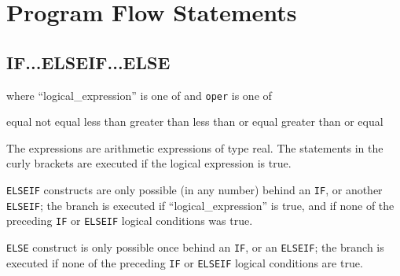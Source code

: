 
\chapter{Program Flow Statements}

 




\section{IF...ELSEIF...ELSE}
\label{sec:if}


where ``logical\_expression'' is one of 
and \texttt{oper} is one of 
\begin{madlist}
\ttitem{==}  equal
\ttitem{<>}  not equal
\ttitem{<}  less than
\ttitem{>}  greater than
\ttitem{<=}  less than or equal
\ttitem{>=}  greater than or equal
\end{madlist}

The expressions are arithmetic expressions of type real. The statements
in the curly brackets are executed if the logical expression is true.  

\texttt{ELSEIF} constructs are only possible (in any number) behind an
\texttt{IF}, or another \texttt{ELSEIF}; the branch is executed if
``logical\_expression'' is true, and if none of the preceding \texttt{IF}
or \texttt{ELSEIF} logical conditions was true.   


\texttt{ELSE} construct is only possible once behind an \texttt{IF}, or
an \texttt{ELSEIF}; the branch is executed if none of the preceding
\texttt{IF} or \texttt{ELSEIF} logical conditions are true.   

